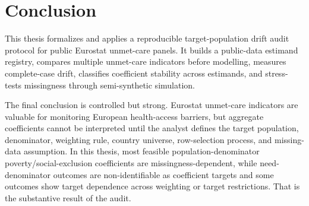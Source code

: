 \section{Conclusion}

This thesis formalizes and applies a reproducible target-population drift audit protocol for public Eurostat unmet-care panels. It builds a public-data estimand registry, compares multiple unmet-care indicators before modelling, measures complete-case drift, classifies coefficient stability across estimands, and stress-tests missingness through semi-synthetic simulation.

The final conclusion is controlled but strong. Eurostat unmet-care indicators are valuable for monitoring European health-access barriers, but aggregate coefficients cannot be interpreted until the analyst defines the target population, denominator, weighting rule, country universe, row-selection process, and missing-data assumption. In this thesis, most feasible population-denominator poverty/social-exclusion coefficients are missingness-dependent, while need-denominator outcomes are non-identifiable as coefficient targets and some outcomes show target dependence across weighting or target restrictions. That is the substantive result of the audit.
